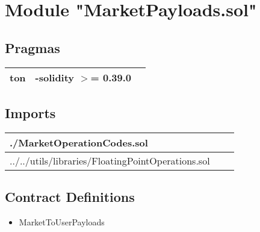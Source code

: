 
\section{Module "MarketPayloads.sol"}


\subsection{Pragmas}


\noindent\begin{tabular}{|l|l|p{5cm}|}\hline
ton & -solidity $>$= 0.39.0 &\\\hline
\end{tabular}


\subsection{Imports}


\noindent\begin{tabular}{|l|l|p{5cm}|}\hline
./MarketOperationCodes.sol &\\\hline
../../utils/libraries/FloatingPointOperations.sol &\\\hline
\end{tabular}


\subsection{Contract Definitions}

\begin{itemize}
\item MarketToUserPayloads
\end{itemize}
